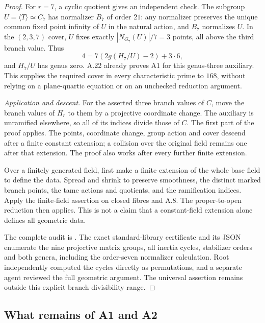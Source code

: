 \begin{proof}
For $r=7$, a cyclic quotient gives an independent
check. The subgroup $U=\langle T\rangle\simeq C_7$
has normalizer $B_7$ of order $21$: any normalizer
preserves the unique common fixed point infinity
of $U$ in the natural action, and $B_7$ normalizes
$U$. In the $(2,3,7)$ cover, $U$ fixes exactly
$|N_{G_7}(U)|/7=3$ points, all above the third
branch value. Thus
\[
 4=7(2g(H_7/U)-2)+3\cdot6,
\]
and $H_7/U$ has genus zero. A.22 already proves
A1 for this genus-three auxiliary. This supplies
the required cover in every characteristic prime
to $168$, without relying on a plane-quartic
equation or on an unchecked reduction argument.

\emph{Application and descent.}
For the asserted three branch values of $C$, move
the branch values of $H_r$ to them by a projective
coordinate change. The auxiliary is unramified
elsewhere, so all of its indices divide those of
$C$. The first part of the proof applies. The
points, coordinate change, group action and cover
descend after a finite constant extension; a
collision over the original field remains one
after that extension. The proof also works after
every further finite extension.

Over a finitely generated field, first make a
finite extension of the whole base field to define
the data. Spread and shrink to preserve smoothness,
the distinct marked branch points, the tame actions
and quotients, and the ramification indices. Apply
the finite-field assertion on closed fibres and
A.8. The proper-to-open reduction then applies.
This is not a claim that a constant-field extension
alone defines all geometric data.

The complete audit is
.
The exact standard-library certificate
and its JSON enumerate the nine projective matrix
groups, all inertia cycles, stabilizer orders and
both genera, including the order-seven normalizer
calculation. Root independently computed the
cycles directly as permutations, and a separate
agent reviewed the full geometric argument.
The universal assertion remains outside this
explicit branch-divisibility range.
\end{proof}

\subsection{What remains of A1 and A2}

